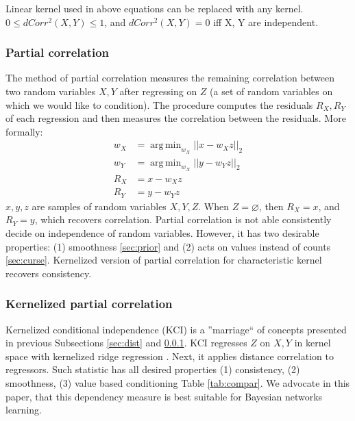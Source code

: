 \documentclass{article} %
\DeclareMathOperator*{\argmin}{arg\,min}
\begin{document}
Linear kernel used in above equations can be replaced with any kernel. $0 \leq dCorr^2(X, Y) \leq 1$, and $dCorr^2(X, Y) = 0$ iff X, Y are independent. 

\subsubsection{Partial correlation}\label{sec:corr}
The method of partial correlation measures the remaining correlation between two random variables $X, Y$ after regressing on $Z$ (a set of random 
variables on which we would like to condition).  The procedure computes the residuals $R_X, R_Y$ of each regression and then measures the correlation between the residuals. More formally:
\begin{align*}
  w_X &= \argmin_{w_X} ||x - w_X z||_{2} \\
  w_Y &= \argmin_{w_X} ||y - w_Y z||_{2} \\
  R_X &= x - w_X z \\
  R_Y &= y - w_Y z
\end{align*}
$x, y, z$ are samples of random variables $X, Y, Z$. When $Z = \varnothing$, then $R_X = x$, and $R_Y = y$, which
recovers correlation. Partial correlation is not able consistently decide
on independence of random variables. However, it has two desirable properties: (1) smoothness \ref{sec:prior} and (2)
acts on values instead of counts \ref{sec:curse}. Kernelized version of partial correlation for 
characteristic kernel recovers consistency.


\subsubsection{Kernelized partial correlation}\label{sec:kci}
Kernelized conditional independence (KCI) \cite{zhang2012kernel} is a ''marriage`` of concepts presented in 
previous Subsections \ref{sec:dist} and \ref{sec:corr}. KCI regresses $Z$ on $X, Y$ in kernel space with kernelized
ridge regression \cite{saunders1998ridge}. Next,
it applies distance correlation to regressors. Such statistic has all desired properties (1) consistency, (2) smoothness, 
(3) value based conditioning Table \ref{tab:compar}. We advocate in this paper, that this dependency measure
is best suitable for Bayesian networks learning. 
\end{document}
